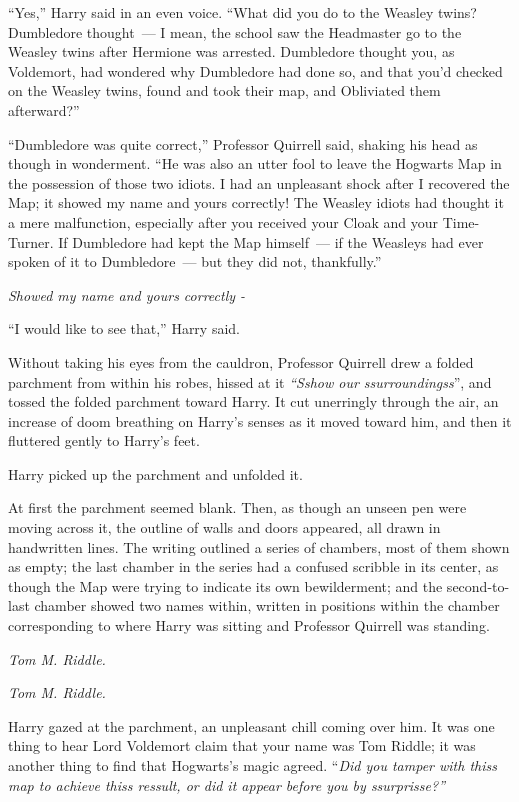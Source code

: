 ``Yes,'' Harry said in an even voice. ``What did you do to the Weasley twins? Dumbledore thought~--- I mean, the school saw the Headmaster go to the Weasley twins after Hermione was arrested. Dumbledore thought you, as Voldemort, had wondered why Dumbledore had done so, and that you'd checked on the Weasley twins, found and took their map, and Obliviated them afterward?''

``Dumbledore was quite correct,'' Professor Quirrell said, shaking his head as though in wonderment. ``He was also an utter fool to leave the Hogwarts Map in the possession of those two idiots. I had an unpleasant shock after I recovered the Map; it showed my name and yours correctly! The Weasley idiots had thought it a mere malfunction, especially after you received your Cloak and your Time-Turner. If Dumbledore had kept the Map himself~--- if the Weasleys had ever spoken of it to Dumbledore~--- but they did not, thankfully.''

\emph{Showed my name and yours correctly -}

``I would like to see that,'' Harry said.

Without taking his eyes from the cauldron, Professor Quirrell drew a folded parchment from within his robes, hissed at it \emph{``Sshow our ssurroundingss}'', and tossed the folded parchment toward Harry. It cut unerringly through the air, an increase of doom breathing on Harry's senses as it moved toward him, and then it fluttered gently to Harry's feet.

Harry picked up the parchment and unfolded it.

At first the parchment seemed blank. Then, as though an unseen pen were moving across it, the outline of walls and doors appeared, all drawn in handwritten lines. The writing outlined a series of chambers, most of them shown as empty; the last chamber in the series had a confused scribble in its center, as though the Map were trying to indicate its own bewilderment; and the second-to-last chamber showed two names within, written in positions within the chamber corresponding to where Harry was sitting and Professor Quirrell was standing.

\emph{Tom M. Riddle.}

\emph{Tom M. Riddle.}

Harry gazed at the parchment, an unpleasant chill coming over him. It was one thing to hear Lord Voldemort claim that your name was Tom Riddle; it was another thing to find that Hogwarts's magic agreed. ``\emph{Did you tamper with thiss map to achieve thiss ressult, or did it appear before you by ssurprisse?''}

